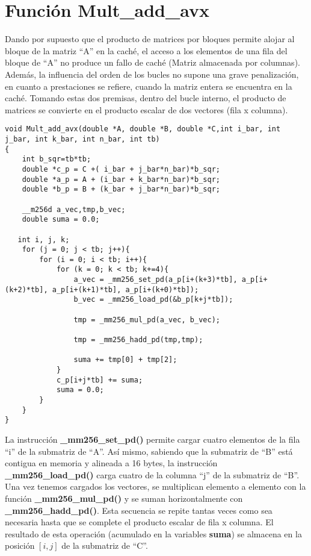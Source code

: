 \documentclass[11pt]{article}
\begin{document}
\section{Función Mult\_add\_avx}
Dando por supuesto que el producto de matrices por bloques permite alojar al bloque de la matriz ``A'' en la caché, el acceso a los elementos de una fila del bloque de ``A'' no produce un fallo de caché (Matriz almacenada por columnas). Además, la influencia del orden de los bucles no supone una grave penalización, en cuanto a prestaciones se refiere, cuando la matriz entera se encuentra en la caché. Tomando estas dos premisas, dentro del bucle interno, el producto de matrices se convierte en el producto escalar de dos vectores (fila x columna).

\begin{verbatim}
void Mult_add_avx(double *A, double *B, double *C,int i_bar, int j_bar, int k_bar, int n_bar, int tb) 
{
    int b_sqr=tb*tb;
    double *c_p = C +( i_bar + j_bar*n_bar)*b_sqr;
    double *a_p = A + (i_bar + k_bar*n_bar)*b_sqr;
    double *b_p = B + (k_bar + j_bar*n_bar)*b_sqr;

    __m256d a_vec,tmp,b_vec;
    double suma = 0.0;

   int i, j, k;
    for (j = 0; j < tb; j++){
        for (i = 0; i < tb; i++){
            for (k = 0; k < tb; k+=4){
                a_vec = _mm256_set_pd(a_p[i+(k+3)*tb], a_p[i+(k+2)*tb], a_p[i+(k+1)*tb], a_p[i+(k+0)*tb]);
                b_vec = _mm256_load_pd(&b_p[k+j*tb]);

                tmp = _mm256_mul_pd(a_vec, b_vec);

                tmp = _mm256_hadd_pd(tmp,tmp);

                suma += tmp[0] + tmp[2];
            }
            c_p[i+j*tb] += suma;
            suma = 0.0;
        }
    }
}
\end{verbatim}
La instrucción \textbf{\_mm256\_set\_pd()} permite cargar cuatro elementos de la fila ``i'' de la submatriz de ``A''. Así mismo, sabiendo que la submatriz de ``B'' está contigua en memoria y alineada a 16 bytes, la instrucción \textbf{\_mm256\_load\_pd()} carga cuatro de la columna ``j'' de la submatriz de ``B''. Una vez tenemos cargados los vectores, se multiplican elemento a elemento con la función \textbf{\_mm256\_mul\_pd()} y se suman horizontalmente con \textbf{\_mm256\_hadd\_pd()}. Esta secuencia se repite tantas veces como sea necesaria hasta que se complete el producto escalar de fila x columna. El resultado de esta operación (acumulado en la variables \textbf{suma}) se almacena en la posición $[i,j]$ de la submatriz de ``C''.
\end{document}
